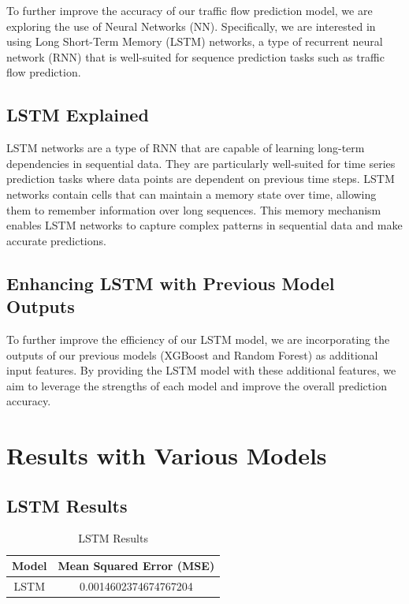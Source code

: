 \documentclass{IEEEtran}
\begin{document}
To further improve the accuracy of our traffic flow prediction model, we are exploring the use of Neural Networks (NN). Specifically, we are interested in using Long Short-Term Memory (LSTM) networks, a type of recurrent neural network (RNN) that is well-suited for sequence prediction tasks such as traffic flow prediction.

\subsection{LSTM Explained}

LSTM networks are a type of RNN that are capable of learning long-term dependencies in sequential data. They are particularly well-suited for time series prediction tasks where data points are dependent on previous time steps. LSTM networks contain cells that can maintain a memory state over time, allowing them to remember information over long sequences. This memory mechanism enables LSTM networks to capture complex patterns in sequential data and make accurate predictions.

\subsection{Enhancing LSTM with Previous Model Outputs}

To further improve the efficiency of our LSTM model, we are incorporating the outputs of our previous models (XGBoost and Random Forest) as additional input features. By providing the LSTM model with these additional features, we aim to leverage the strengths of each model and improve the overall prediction accuracy.

\section{Results with Various Models}

\subsection{LSTM Results}

\begin{table}[htbp]
\caption{LSTM Results}
\begin{center}
\begin{tabular}{|c|c|}
\hline
\textbf{Model} & \textbf{Mean Squared Error (MSE)} \\
\hline
LSTM & 0.0014602374674767204 \\
\hline
\end{tabular}
\end{center}
\label{default}
\end{table}%
\end{document}
